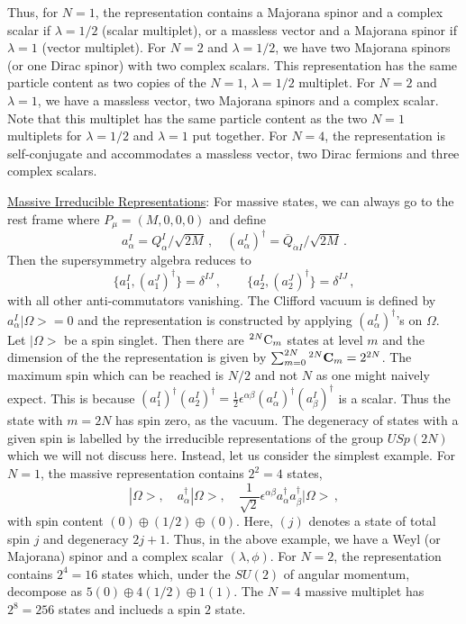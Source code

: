 Thus, for $N=1$, the representation contains a Majorana spinor and a
complex scalar if $\lambda=1/2$ (scalar multiplet), or a massless
vector and a Majorana spinor if $\lambda=1$ (vector multiplet). 
For $N=2$ and $\lambda=1/2$, we have two Majorana spinors (or one
Dirac spinor) with two complex scalars. This representation has the
same particle content as two copies of the $N=1$, $\lambda=1/2$
multiplet. For $N=2$ and $\lambda=1$, we have a massless vector, two
Majorana spinors and a complex scalar. Note that this multiplet has
the same particle content as the two $N=1$ multiplets for
$\lambda=1/2$ and $\lambda=1$ put together. For $N=4$, the
representation is self-conjugate and accommodates a massless vector,
two Dirac fermions and three complex scalars.   

\noindent\underline{Massive Irreducible Representations}:
\noindent For massive states, we can always go to the rest frame where
$P_\mu=(M,0,0,0)$ and define 
$$
a^I_\alpha=Q^I_\alpha/\sqrt{2M}\,,\quad (a^I_\alpha)^\dagger= 
{\bar Q}_{\dot\alpha I}/\sqrt{2M}\,.
$$
Then the supersymmetry algebra reduces to 
$$
\{a^I_1,(a_1^J)^\dagger\}=\delta^{IJ}\,,\qquad 
\{a^I_2,(a_2^J)^\dagger\}=\delta^{IJ}\,,
$$
with all other anti-commutators vanishing. The Clifford vacuum is
defined by $a^I_\alpha |\Omega>=0$ and the representation is
constructed by applying $(a^I_\alpha)^\dagger$'s on $\Omega$. Let
$|\Omega>$ be a spin singlet. Then there are $^{2N}{\rm C}_m$ states
at level $m$ and the dimension of the the representation is given by  
$\sum_{m=0}^{2N}{}^{2N}{\rm\bf C}_m=2^{2N}$. The maximum spin which can
be reached is $N/2$ and not $N$ as one might naively expect. This is
because $(a^I_1)^\dagger(a^I_2)^\dagger=\frac{1}{2}
\epsilon^{\alpha\beta} (a^I_\alpha)^\dagger(a^I_\beta)^\dagger$ is a
scalar. Thus the state with $m=2N$ has spin zero, as the vacuum. The
degeneracy of states with a given spin is labelled by the irreducible
representations of the group $USp(2N)$ which we will not discuss
here. Instead, let us consider the simplest example. For $N=1$, the
massive representation contains $2^2=4$ states, 
$$
|\Omega>,\quad a^\dagger_\alpha |\Omega>,\quad\frac{1}{\sqrt{2}}
\epsilon^{\alpha \beta} a^\dagger_\alpha a^\dagger_\beta |\Omega>\,,
$$
with spin content $(0)\oplus (1/2)\oplus (0)$. Here, $(j)$ denotes a
state of total spin $j$ and degeneracy $2j+1$. Thus, in the above
example, we have a Weyl (or Majorana) spinor and a complex scalar
$(\lambda , \phi)$. For $N=2$, the representation contains $2^4=16$
states which, under the $SU(2)$ of angular momentum, decompose as
$5(0)\oplus 4(1/2)\oplus 1(1)$. The $N=4$ massive multiplet has
$2^8=256$ states and inclueds a spin $2$ state.


